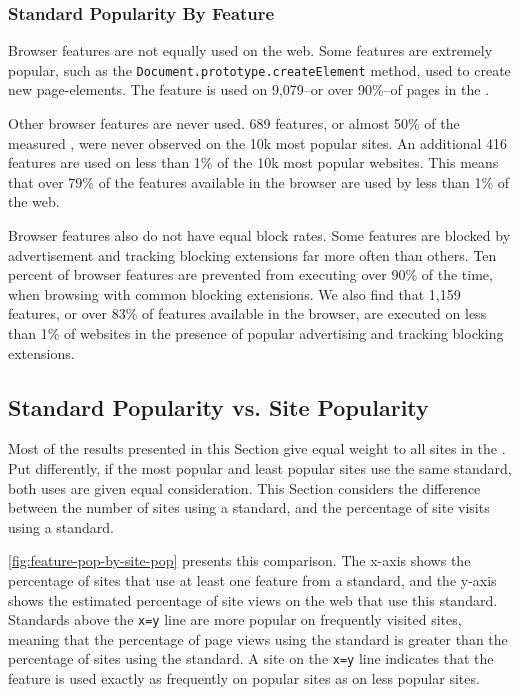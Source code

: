 \subsubsection{Standard Popularity By Feature}
Browser features are not equally used on the web.  Some features are extremely
popular, such as the \texttt{Document.prototype.createElement} method,
used to create new page-elements.  The feature is used on 9,079--or over
90\%--of pages in the \ATK.

Other browser features are never used.  689 features, or almost 50\% of the
measured \numfeatures, were never observed on the 10k most popular
sites.  An additional 416 features are used on less than 1\% of the 10k most
popular websites.  This means that over 79\% of the features
available in the browser are used by less than 1\% of the web.

Browser features also do not have equal block rates. Some features
are blocked by advertisement and tracking blocking extensions far more often
than others.  Ten percent of browser features are prevented from executing over
90\% of the time, when browsing with common blocking extensions.   We also find
that 1,159 features, or over 83\% of features available in the browser, are
executed on less than 1\% of websites in the presence of popular advertising
and tracking blocking extensions.


\subsection{Standard Popularity vs. Site Popularity}
\label{measurement:results:popularity}

Most of the results presented in this Section give equal weight to all sites in
the \ATK.  Put differently, if the most popular and least popular sites use the
same standard, both uses are given equal consideration.  This Section considers
the difference between the number of sites using a standard, and the percentage
of site visits using a standard.

\ref{fig:feature-pop-by-site-pop} presents this comparison.
The x-axis shows the percentage of sites that use at least one feature from a
standard, and the y-axis shows the estimated percentage of site views on the
web that use this standard.  Standards above the \texttt{x=y} line are more
popular on frequently visited sites, meaning that the percentage of page views
using the standard is greater than the percentage of sites using the standard.
A site on the \texttt{x=y} line indicates that the feature is used exactly as
frequently on popular sites as on less popular sites.

